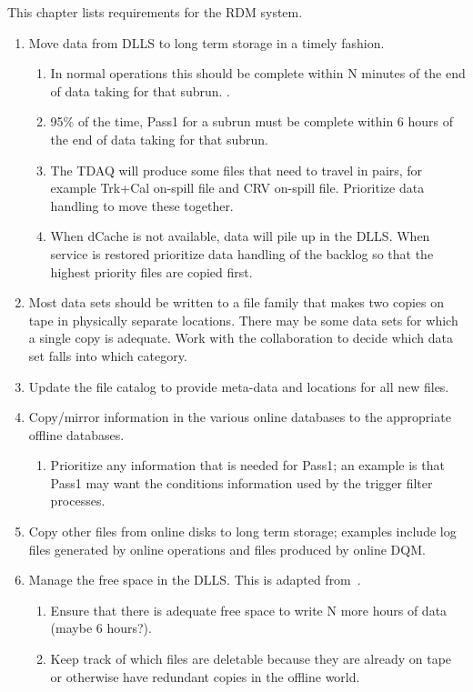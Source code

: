 This chapter lists requirements for the RDM system.

\begin{enumerate}
\item Move data from DLLS to long term storage in a timely fashion.
  \begin{enumerate}
  \item In normal operations this should be complete within N minutes of the end of data taking for that subrun. .
  \item 95\% of the time, Pass1 for a subrun must be complete within 6 hours of the end of data taking for that subrun.
  \item The TDAQ will produce some files that need to travel in pairs, for example Trk+Cal on-spill file and CRV on-spill file.
    Prioritize data handling to move these together.
  \item When dCache is not available, data will pile up in the DLLS.  When service is restored prioritize data handling of the backlog
    so that the highest priority files are copied first.
  \end{enumerate}
\item Most data sets should be written to a file family that makes two copies on tape in physically separate locations.
  There may be some data sets for which a single copy is adequate.
  Work with the collaboration to decide which data set falls into which category.
\item Update the file catalog to provide meta-data and locations for all new files.
\item Copy/mirror information in the various online databases to the appropriate offline databases.
  \begin{enumerate}
  \item Prioritize any information that is needed for Pass1; an example is that Pass1 may want the conditions information
    used by the trigger filter processes.
  \end{enumerate}
\item Copy other files from online disks to long term storage; examples include log files generated by online
  operations and files produced by online DQM.
\item Manage the free space in the DLLS.  This is adapted from~\cite{OnlineMonitoring}.
  \begin{enumerate}
   \item Ensure that there is adequate free space to write N more hours of data (maybe 6 hours?).
   \item Keep track of which files are deletable because they are already on tape or otherwise have redundant copies in the offline world.

\end{enumerate}
\end{enumerate}
